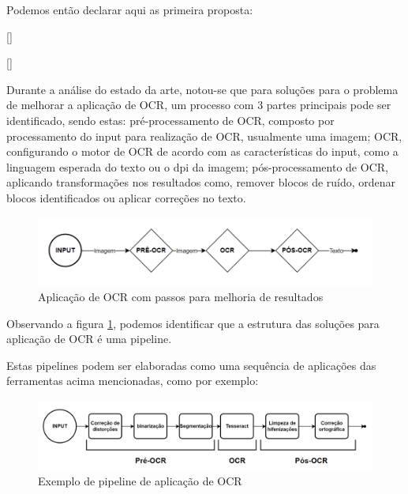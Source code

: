 Podemos então declarar aqui as primeira proposta: 

[\normalsize]

[\normalsize]

Durante a análise do estado da arte, notou-se que para soluções para o problema de melhorar a aplicação de OCR, um processo com 3 partes principais pode ser identificado, sendo estas: pré-processamento de OCR, composto por processamento do input para realização de OCR, usualmente uma imagem; OCR, configurando o motor de OCR de acordo com as características do input, como a linguagem esperada do texto ou o dpi da imagem; pós-processamento de OCR, aplicando transformações nos resultados como, remover blocos de ruído, ordenar blocos identificados ou aplicar correções no texto. 

\begin{figure}[H]
     \centering
     \includegraphics[width=1\textwidth]{images/diagramas/pipeline_alto_nivel.png}
     \caption{Aplicação de OCR com passos para melhoria de resultados}
     \label{fig:pipeline_high_level}
\end{figure}
 
Observando a figura \ref{fig:pipeline_high_level}, podemos identificar que a estrutura das soluções para aplicação de OCR é uma pipeline.

Estas pipelines podem ser elaboradas como uma sequência de aplicações das ferramentas acima mencionadas, como por exemplo:

\begin{figure}[H]
	\centering
	\includegraphics[width=1\textwidth]{images/diagramas/pipeline_exemplo.png}
	\caption{Exemplo de pipeline de aplicação de OCR}
	\label{fig:pipeline_example}
\end{figure}
 
